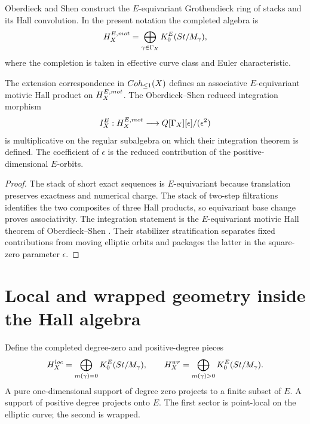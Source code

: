 Oberdieck and Shen construct the $E$-equivariant Grothendieck ring of stacks and its Hall convolution.  In the present notation the completed algebra is
\[
 H_X^{E,mot}
 =\bigoplus_{\gamma\in\Gamma_X}
 K_0^E(St/M_\gamma),
\]
where the completion is taken in effective curve class and Euler characteristic.

\begin{theorem}
The extension correspondence in $Coh_{\leq1}(X)$ defines an associative $E$-equivariant motivic Hall product on $H_X^{E,mot}$.  The Oberdieck--Shen reduced integration morphism
\[
 I_X^E:H_X^{E,mot}
 \longrightarrow
 Q[\Gamma_X][\epsilon]/(\epsilon^2)
\]
is multiplicative on the regular subalgebra on which their integration theorem is defined.  The coefficient of $\epsilon$ is the reduced contribution of the positive-dimensional $E$-orbits.
\end{theorem}
\begin{proof}
The stack of short exact sequences is $E$-equivariant because translation preserves exactness and numerical charge.  The stack of two-step filtrations identifies the two composites of three Hall products, so equivariant base change proves associativity.  The integration statement is the $E$-equivariant motivic Hall theorem of Oberdieck--Shen \cite{OberdieckShen}.  Their stabilizer stratification separates fixed contributions from moving elliptic orbits and packages the latter in the square-zero parameter $\epsilon$.
\end{proof}

\chapter{Local and wrapped geometry inside the Hall algebra}
Define the completed degree-zero and positive-degree pieces
\[
 H_X^{loc}
 =\bigoplus_{m(\gamma)=0}
 K_0^E(St/M_\gamma),
 \qquad
 H_X^{wr}
 =\bigoplus_{m(\gamma)>0}
 K_0^E(St/M_\gamma).
\]
A pure one-dimensional support of degree zero projects to a finite subset of $E$.  A support of positive degree projects onto $E$.  The first sector is point-local on the elliptic curve; the second is wrapped.

